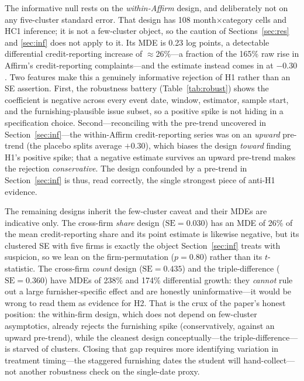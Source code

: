 \documentclass[12pt]{article}
\begin{document}
The informative null rests on the \emph{within-Affirm} design, and deliberately not on any
five-cluster standard error. That design has 108 month$\times$category cells and HC1 inference;
it is not a few-cluster object, so the caution of Sections~\ref{sec:res} and \ref{sec:inf} does
not apply to it. Its MDE is 0.23 log points, a detectable differential credit-reporting increase
of $\approx$26\%---a fraction of the 165\% raw rise in Affirm's credit-reporting complaints---and
the estimate instead comes in at $-0.30$. Two features make this a genuinely informative
rejection of H1 rather than an SE assertion. First, the robustness battery
(Table~\ref{tab:robust}) shows the coefficient is negative across every event date, window,
estimator, sample start, and the furnishing-plausible issue subset, so a positive spike is not
hiding in a specification choice. Second---reconciling with the pre-trend uncovered in
Section~\ref{sec:inf}---the within-Affirm credit-reporting series was on an \emph{upward}
pre-trend (the placebo splits average $+0.30$), which biases the design \emph{toward} finding
H1's positive spike; that a negative estimate survives an upward pre-trend makes the rejection
\emph{conservative}. The design confounded by a pre-trend in Section~\ref{sec:inf} is thus, read
correctly, the single strongest piece of anti-H1 evidence.

The remaining designs inherit the few-cluster caveat and their MDEs are indicative only. The
cross-firm \emph{share} design ($\text{SE}=0.030$) has an MDE of 26\% of the mean
credit-reporting share and its point estimate is likewise negative, but its clustered SE with
five firms is exactly the object Section~\ref{sec:inf} treats with suspicion, so we lean on the
firm-permutation ($p=0.80$) rather than its $t$-statistic. The cross-firm \emph{count} design
($\text{SE}=0.435$) and the triple-difference ($\text{SE}=0.360$) have MDEs of 238\% and 174\%
differential growth: they \emph{cannot} rule out a large furnisher-specific effect and are
honestly uninformative---it would be wrong to read them as evidence for H2. That is the crux of
the paper's honest position: the within-firm design, which does not depend on few-cluster
asymptotics, already rejects the furnishing spike (conservatively, against an upward pre-trend),
while the cleanest design conceptually---the triple-difference---is starved of clusters. Closing
that gap requires more identifying variation in treatment timing---the staggered furnishing dates
the student will hand-collect---not another robustness check on the single-date proxy.
\end{document}
